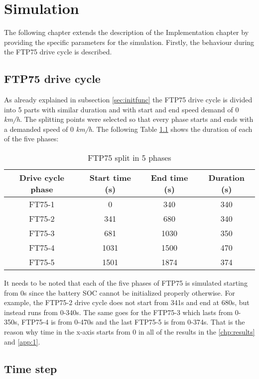 \chapter{Simulation}
\label{chp:simulation}
The following chapter extends the description of the Implementation chapter by providing the specific parameters for the simulation. Firstly, the behaviour during the FTP75 drive cycle is described.

\section{FTP75 drive cycle}
As already explained in subsection \ref{sec:initfunc} the FTP75 drive cycle is divided into 5 parts with similar duration and with start and end speed demand of 0 \textit{km/h}. The splitting points were selected so that every phase starts and ends with a demanded speed of 0 \textit{km/h}. The following Table \ref{tab:drivecyclephases} shows the duration of each of the five phases:

\begin{table}
\centering
\begin{tabular}{ |c|c|c|c| } 
 \hline
 Drive cycle phase & Start time (s) & End time (s) & Duration (s) \\
 \hline\hline
 FT75-1 & 0 & 340 & 340\\ 
 FT75-2 & 341 & 680 & 340\\ 
 FT75-3 & 681 & 1030 & 350\\ 
 FT75-4 & 1031 & 1500 & 470\\ 
 FT75-5 & 1501 & 1874 & 374\\ 
 \hline
\end{tabular}
\caption{FTP75 split in 5 phases}
\label{tab:drivecyclephases}
\end{table}

It needs to be noted that each of the five phases of FTP75 is simulated starting from 0s since the battery SOC cannot be initialized properly otherwise. For example, the FTP75-2 drive cycle does not start from 341s and end at 680s, but instead runs from 0-340s. The same goes for the FTP75-3 which lasts from 0-350s, FTP75-4 is from 0-470s and the last FTP75-5 is from 0-374s. That is the reason why time in the x-axis starts from 0 in all of the results in the \ref{chp:results} and \ref{app:1}.

\section{Time step}

